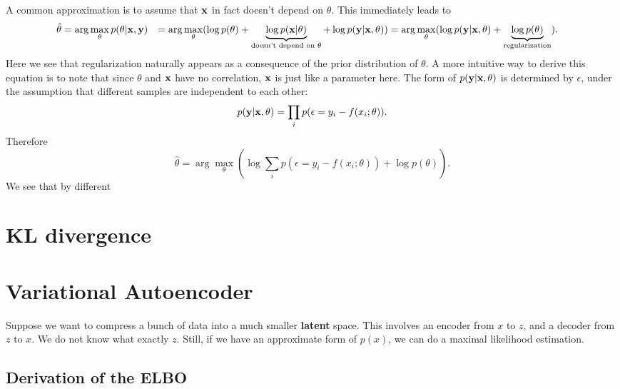 \documentclass[hyperref, a4paper, 12pt]{report}
\newcommand*{\argmax}{\arg\max}
\newcommand*{\concept}[1]{{\textbf{#1}}}
\def\\{}%
\begin{document}
A common approximation is to assume that $\vb{x}$ in fact doesn't depend on $\theta$.
This immediately leads to 
\begin{equation}
    \begin{aligned}
        \hat{\theta} &= \argmax_\theta p(\theta | \vb{x}, \vb{y}) \\
        &= \argmax_\theta (\log p(\theta) + \underbrace{\log p(\vb{x} | \theta)}_{\text{doesn't  depend on $\theta$}} + \log p(\vb{y} | \vb{x}, \theta)) \\
        &= \argmax_\theta (\log p(\vb{y} | \vb{x}, \theta) + \underbrace{\log p(\theta)}_{\text{regularization}}) .
    \end{aligned}
\end{equation}
Here we see that regularization naturally appears as a consequence of the prior distribution of $\theta$.
A more intuitive way to derive this equation is to note that since $\theta$ and $\vb{x}$ have no correlation,
$\vb{x}$ is just like a parameter here.
The form of $p(\vb{y} | \vb{x}, \theta)$ is determined by $\epsilon$,
under the assumption that different samples are independent to each other:
\begin{equation}
    p(\vb{y} | \vb{x}, \theta) = \prod_i p(\epsilon = y_i - f(x_i; \theta)).
\end{equation}
Therefore 
\begin{equation}
    \hat{\theta} = \argmax_\theta \left( \log \sum_i p(\epsilon = y_i- f(x_i; \theta)) + \log p(\theta) \right).
\end{equation}
We see that by different 

\section{KL divergence}

\section{Variational Autoencoder}

Suppose we want to compress a bunch of data into a much smaller \concept{latent} space.
This involves an encoder from $x$ to $z$, and a decoder from $z$ to $x$.
We do not know what exactly $z$.
Still, if we have an approximate form of $p(x)$,
we can do a maximal likelihood estimation.

\subsection{Derivation of the ELBO}
\end{document}
